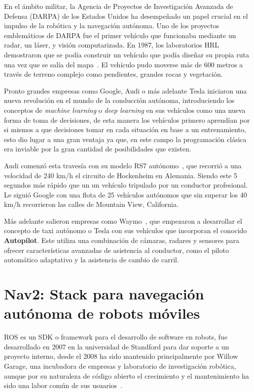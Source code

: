 En el ámbito militar, la Agencia de Proyectos de Investigación Avanzada de Defensa (DARPA) de los Estados Unidos ha desempeñado un 
papel crucial en el impulso de la robótica y la navegación autónoma. Uno de los proyectos emblemáticos de DARPA fue el primer vehículo 
que funcionaba mediante un radar, un láser, y visión computarizada. En 1987, los laboratorios HRL demostraron que se podía construir un 
vehículo que podía diseñar su propia ruta una vez que se salía del mapa~\cite{DARPA20}. El vehículo pudo moverse más de 600 metros a través de terreno 
complejo como pendientes, grandes rocas y vegetación.


Pronto grandes empresas como Google, Audi o más adelante Tesla iniciaron una nueva revolución en el mundo de la conducción autónoma, 
introduciendo los conceptos de \textit{machine learning} o \textit{deep learning} en sus vehículos como una nueva forma de toma de 
decisiones, de esta manera los vehículos primero aprendían por si mismos a que decisiones tomar en cada situación en base a un entrenamiento, 
esto dio lugar a una gran ventaja ya que, en este campo la programación clásica era inviable por la gran cantidad de posibilidades que existen.

Audi comenzó esta travesía con su modelo RS7 autónomo~\cite{audirs715}, que recorrió a una velocidad de 240 km/h el circuito de Hockenheim en Alemania. 
Siendo este 5 segundos más rápido que un un vehículo tripulado por un conductor profesional. Le siguió Google con una flota de 25 
vehículos autónomos que sin superar los 40 km/h recorrieron las calles de Mountain View, California.

Más adelante salieron empresas como Waymo~\cite{waymo24}, que empezaron a desarrollar el concepto de taxi autónomo o Tesla con sus vehículos que 
incorporan el conocido \textbf{Autopilot}. Este utiliza una combinación de cámaras, radares y sensores para ofrecer características 
avanzadas de asistencia al conductor, como el piloto automático adaptativo y la asistencia de cambio de carril.

\section{Nav2: Stack para navegación autónoma de robots móviles}
ROS es un SDK o framework para el desarrollo de software en robots, fue desarrollado en 2007 en la universidad de Standford para 
dar soporte a un proyecto interno, desde el 2008 ha sido mantenido principalmente por Willow Garage, una incubadora de empresas y 
laboratorio de investigación robótica, aunque por su naturaleza de código abierto el crecimiento y el mantenimiento ha sido una labor 
común de sus usuarios~\cite{ros2}.

